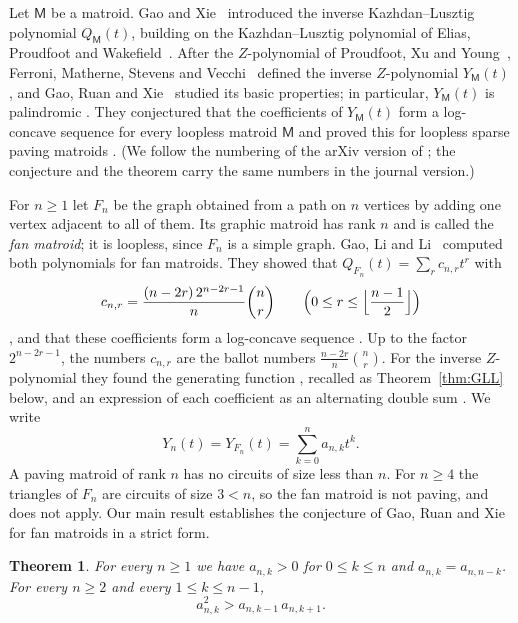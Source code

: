 \documentclass{amsart}
\newtheorem{theorem}{Theorem}[section]
\theoremstyle{definition}
\theoremstyle{remark}
\numberwithin{equation}{section}
\numberwithin{table}{section}
\begin{document}
Let $\mathsf{M}$ be a matroid. Gao and Xie~\cite{GX} introduced the inverse Kazhdan--Lusztig polynomial $Q_{\mathsf{M}}(t)$, building on the Kazhdan--Lusztig polynomial of Elias, Proudfoot and Wakefield~\cite{EPW}. After the $Z$-polynomial of Proudfoot, Xu and Young~\cite{PXY}, Ferroni, Matherne, Stevens and Vecchi~\cite{FMSV} defined the inverse $Z$-polynomial $Y_{\mathsf{M}}(t)$, and Gao, Ruan and Xie~\cite{GRX} studied its basic properties; in particular, $Y_{\mathsf{M}}(t)$ is palindromic \cite[Lemma~2.2]{GRX}. They conjectured that the coefficients of $Y_{\mathsf{M}}(t)$ form a log-concave sequence for every loopless matroid $\mathsf{M}$ \cite[Conjecture~1.5]{GRX} and proved this for loopless sparse paving matroids \cite[Theorem~1.6]{GRX}. (We follow the numbering of the arXiv version of \cite{GRX}; the conjecture and the theorem carry the same numbers in the journal version.)

For $n\ge 1$ let $F_n$ be the graph obtained from a path on $n$ vertices by adding one vertex adjacent to all of them. Its graphic matroid has rank $n$ and is called the \emph{fan matroid}; it is loopless, since $F_n$ is a simple graph. Gao, Li and Li~\cite{GLL} computed both polynomials for fan matroids. They showed that $Q_{F_n}(t)=\sum_{r}c_{n,r}t^r$ with
\begin{equation}\label{eq:c}
c_{n,r}=\frac{(n-2r)\,2^{n-2r-1}}{n}\binom{n}{r}\qquad \Bigl(0\le r\le \Bigl\lfloor\frac{n-1}{2}\Bigr\rfloor\Bigr)
\end{equation}
\cite[Theorem~1.1]{GLL}, and that these coefficients form a log-concave sequence \cite[Theorem~1.2]{GLL}. Up to the factor $2^{n-2r-1}$, the numbers $c_{n,r}$ are the ballot numbers $\frac{n-2r}{n}\binom{n}{r}$. For the inverse $Z$-polynomial they found the generating function \cite[Theorem~3.1]{GLL}, recalled as Theorem~\ref{thm:GLL} below, and an expression of each coefficient as an alternating double sum \cite[Theorem~1.3]{GLL}. We write
\[
Y_n(t)=Y_{F_n}(t)=\sum_{k=0}^{n}a_{n,k}t^k .
\]
A paving matroid of rank $n$ has no circuits of size less than $n$. For $n\ge 4$ the triangles of $F_n$ are circuits of size $3<n$, so the fan matroid is not paving, and \cite[Theorem~1.6]{GRX} does not apply. Our main result establishes the conjecture of Gao, Ruan and Xie for fan matroids in a strict form.

\begin{theorem}\label{thm:main}
For every $n\ge 1$ we have $a_{n,k}>0$ for $0\le k\le n$ and $a_{n,k}=a_{n,n-k}$. For every $n\ge 2$ and every $1\le k\le n-1$,
\[
a_{n,k}^2>a_{n,k-1}\,a_{n,k+1}.
\]
\end{theorem}
\end{document}
